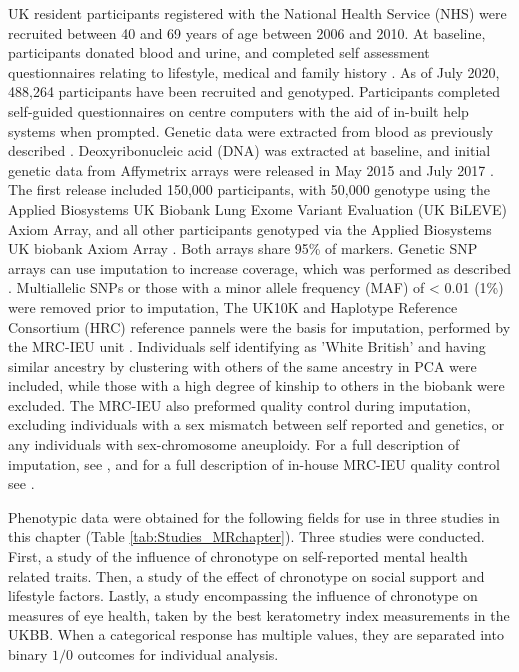 \documentclass[journal,article,submit,moreauthors,pdftex]{Definitions/mdpi}
\begin{document}
UK resident participants registered with the National Health Service (NHS) were recruited between 40 and 69 years of age between 2006 and 2010. At baseline, participants donated blood and urine, and completed self assessment questionnaires relating to lifestyle, medical and family history \citep{allen_uk_2014,collins 2007}. As of July 2020, 488,264 participants have been recruited and genotyped. Participants completed self-guided questionnaires on centre computers with the aid of in-built help systems when prompted. Genetic data were extracted from blood as previously described \citep{bycroft_uk_2018,collins 2007}. Deoxyribonucleic acid (DNA) was extracted at baseline, and initial genetic data from Affymetrix arrays were released in May 2015 and July 2017 \citep{bycroft_uk_2018}. The first release included 150,000 participants, with 50,000 genotype using the Applied Biosystems UK Biobank Lung Exome Variant Evaluation  (UK BiLEVE) Axiom Array, and all other participants genotyped via the Applied Biosystems UK biobank Axiom Array  \citep{bycroft_uk_2018}. Both arrays share 95\% of markers. Genetic SNP arrays can use imputation to increase coverage, which was performed as described \citep{bycroft_uk_2018}. Multiallelic SNPs or those with a minor allele frequency (MAF) of < 0.01 (1\%) were removed prior to imputation, The UK10K and Haplotype Reference Consortium (HRC) reference pannels were the basis for imputation, performed by the MRC-IEU unit \citep{huang 2015, howie 2011}. Individuals self identifying as 'White British' and having similar ancestry by clustering with others of the same ancestry in PCA were included, while those with a high degree of kinship to others in the biobank were excluded. The MRC-IEU also preformed quality control during imputation, excluding individuals with a sex mismatch between self reported and genetics, or any individuals with sex-chromosome aneuploidy. For a full description of imputation, see \citep{bycroft_uk_2018}, and for a full description of in-house MRC-IEU quality control see \citep{ruth_mitchell_mrc_2019}. 

Phenotypic data were obtained for the following fields for use in three studies in this chapter (Table \ref{tab:Studies_MRchapter}). Three studies were conducted. First, a study of the influence of chronotype on self-reported mental health related traits. Then, a study of the effect of chronotype on social support and lifestyle factors. Lastly, a study encompassing the influence of chronotype on measures of eye health, taken by the best keratometry index measurements in the UKBB. When a categorical response has multiple values, they are separated into binary $1/0$ outcomes for individual analysis. 
\end{document}
